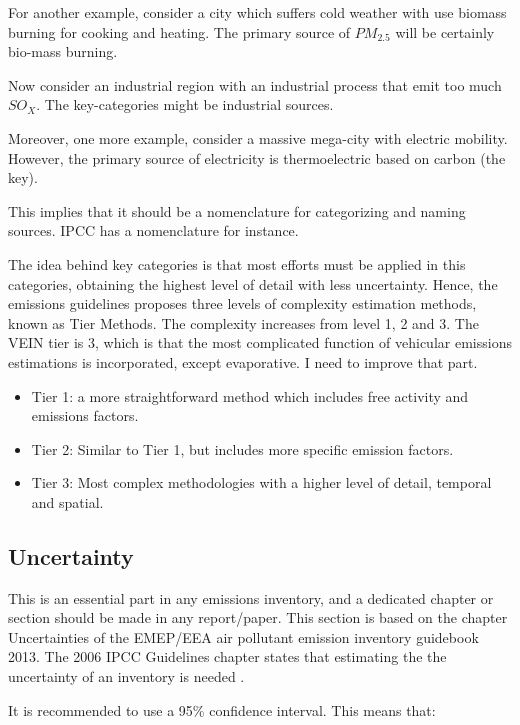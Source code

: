 \documentclass[12pt,graybox,envcountchap,sectrefs]{krantz}
\providecommand{\tightlist}{%
  \setlength{\itemsep}{0pt}\setlength{\parskip}{0pt}}
\theoremstyle{definition}
\theoremstyle{definition}
\theoremstyle{definition}
\theoremstyle{remark}
\begin{document}
For another example, consider a city which suffers cold weather with use
biomass burning for cooking and heating. The primary source of
\(PM_{2.5}\) will be certainly bio-mass burning.

Now consider an industrial region with an industrial process that emit
too much \(SO_X\). The key-categories might be industrial sources.

Moreover, one more example, consider a massive mega-city with electric
mobility. However, the primary source of electricity is thermoelectric
based on carbon (the key).

This implies that it should be a nomenclature for categorizing and
naming sources. IPCC has a nomenclature for instance.

The idea behind key categories is that most efforts must be applied in
this categories, obtaining the highest level of detail with less
uncertainty. Hence, the emissions guidelines \citep{guia} proposes three
levels of complexity estimation methods, known as Tier Methods. The
complexity increases from level 1, 2 and 3. The VEIN tier is 3, which is
that the most complicated function of vehicular emissions estimations is
incorporated, except evaporative. I need to improve that part.

\begin{itemize}
\tightlist
\item
  Tier 1: a more straightforward method which includes free activity and
  emissions factors.
\item
  Tier 2: Similar to Tier 1, but includes more specific emission
  factors.
\item
  Tier 3: Most complex methodologies with a higher level of detail,
  temporal and spatial.
\end{itemize}

\subsection{Uncertainty}\label{uncertainty}

This is an essential part in any emissions inventory, and a dedicated
chapter or section should be made in any report/paper. This section is
based on the chapter Uncertainties \citep{guiau} of the EMEP/EEA air
pollutant emission inventory guidebook 2013. The 2006 IPCC Guidelines
chapter states that estimating the the uncertainty of an inventory is
needed \citep{change20062006}.

It is recommended to use a 95\% confidence interval. This means that:
\end{document}
